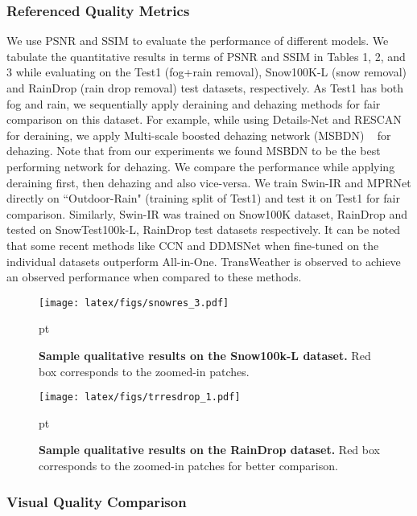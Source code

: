 \documentclass[10pt,twocolumn,letterpaper]{article}
\begin{document}
\subsubsection{Referenced Quality Metrics}
We use PSNR and SSIM to evaluate the performance of different models. We tabulate the quantitative results in terms of PSNR and SSIM in Tables 1, 2, and 3 while evaluating on the Test1 (fog+rain removal), Snow100K-L (snow removal) and RainDrop (rain drop removal) test datasets, respectively. As Test1 has both fog and rain, we sequentially apply deraining and dehazing methods for fair comparison on this dataset. For example, while using Details-Net and RESCAN for deraining, we apply Multi-scale boosted dehazing network (MSBDN) ~\cite{dong2020multi} for dehazing. Note that from our experiments we found MSBDN to be the best performing network for dehazing. We compare the performance while applying  deraining first, then dehazing and also vice-versa. We train Swin-IR and MPRNet directly on ``Outdoor-Rain" (training split of Test1) and test it on Test1 for fair comparison. Similarly, Swin-IR was trained on Snow100K dataset, RainDrop and tested on SnowTest100k-L, RainDrop test datasets respectively.  It can be noted that some recent methods like CCN and DDMSNet when fine-tuned on the individual datasets outperform All-in-One. TransWeather is observed to achieve an observed performance when compared to these methods.





\begin{figure}[]
	\centering
	\texttt{[image: latex/figs/snowres\_3.pdf]} 
	
	 pt
	\caption{\textbf{Sample qualitative results on the Snow100k-L dataset.}  Red box corresponds to the zoomed-in patches. \label{snow} 
	}
	
\end{figure}

\begin{figure*}[]
	\centering
	\texttt{[image: latex/figs/trresdrop\_1.pdf]} 
	
	 pt
	\caption{\textbf{Sample qualitative results on the RainDrop dataset.}  Red box corresponds to the zoomed-in patches for better comparison. \label{drop} 
	}
	
\end{figure*}



\subsubsection{Visual Quality Comparison}
\end{document}
